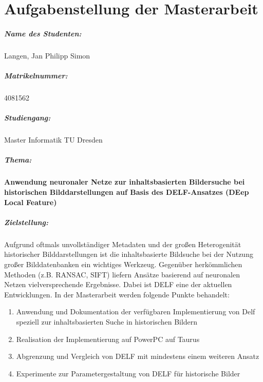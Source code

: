 \chapter*{Aufgabenstellung der Masterarbeit}

\paragraph{Name des Studenten:\qquad} Langen, Jan Philipp Simon
\paragraph{Matrikelnummer:\qquad\qquad\hspace{2pt}} 4081562
\paragraph{Studiengang:\hspace{63pt}} Master Informatik TU Dresden
\paragraph{Thema:\hspace{93.5pt}}
\parbox[t]{310pt}{
\textbf{Anwendung neuronaler Netze zur inhaltsbasierten Bildersuche bei historischen Bilddarstellungen auf Basis des DELF-Ansatzes (DEep Local Feature)}}
\paragraph{Zielstellung:\hspace{67.5pt}}\parbox[t]{310pt}{
Aufgrund oftmals unvollständiger Metadaten und der großen Heterogenität historischer Bilddarstellungen ist die inhaltsbasierte Bildsuche bei der Nutzung großer Bilddatenbanken ein wichtiges Werkzeug. Gegenüber herkömmlichen Methoden (z.B. RANSAC, SIFT) liefern Ansätze basierend auf neuronalen Netzen vielversprechende Ergebnisse. Dabei ist DELF eine der aktuellen Entwicklungen. In der Masterarbeit werden folgende Punkte behandelt:
\begin{enumerate}
\item Anwendung und Dokumentation der verfügbaren Implementierung von Delf speziell zur inhaltsbasierten Suche in historischen Bildern
\item Realisation der Implementierung auf PowerPC auf Taurus
\item Abgrenzung und Vergleich von DELF mit mindestens einem weiteren Ansatz
\item Experimente zur Parametergestaltung von DELF für historische Bilder 
\end{enumerate}
}
